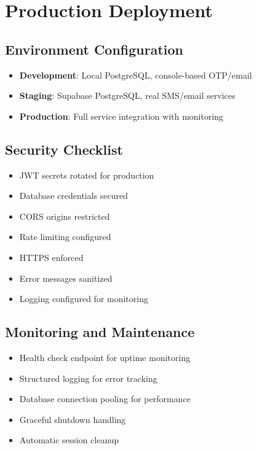 \documentclass[12pt,a4paper]{article}
\begin{document}
\section{Production Deployment}

\subsection{Environment Configuration}
\begin{itemize}
    \item \textbf{Development}: Local PostgreSQL, console-based OTP/email
    \item \textbf{Staging}: Supabase PostgreSQL, real SMS/email services
    \item \textbf{Production}: Full service integration with monitoring
\end{itemize}

\subsection{Security Checklist}
\begin{itemize}
    \item[$\square$] JWT secrets rotated for production
    \item[$\square$] Database credentials secured
    \item[$\square$] CORS origins restricted
    \item[$\square$] Rate limiting configured
    \item[$\square$] HTTPS enforced
    \item[$\square$] Error messages sanitized
    \item[$\square$] Logging configured for monitoring
\end{itemize}

\subsection{Monitoring and Maintenance}
\begin{itemize}
    \item Health check endpoint for uptime monitoring
    \item Structured logging for error tracking
    \item Database connection pooling for performance
    \item Graceful shutdown handling
    \item Automatic session cleanup
\end{itemize}
\end{document}
